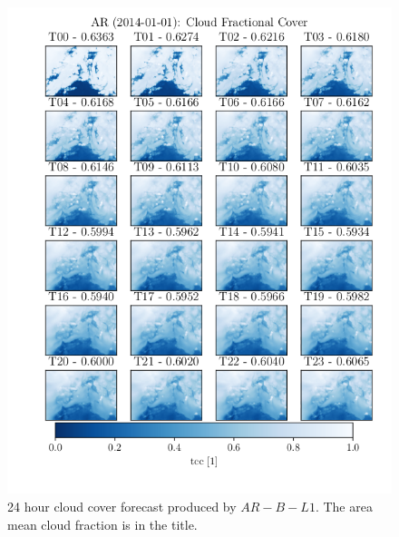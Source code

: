 \begin{figure}
    \centering
    \includegraphics{python_figs/AR_timelapse_cloud_cover_24hrs_from_2014_01_01.png}
    \caption{24 hour cloud cover forecast produced by $AR-B-L1$. The area mean  cloud fraction is in the title.}
    \label{fig:timelapse_ar}
\end{figure}

\cleardoublepage
